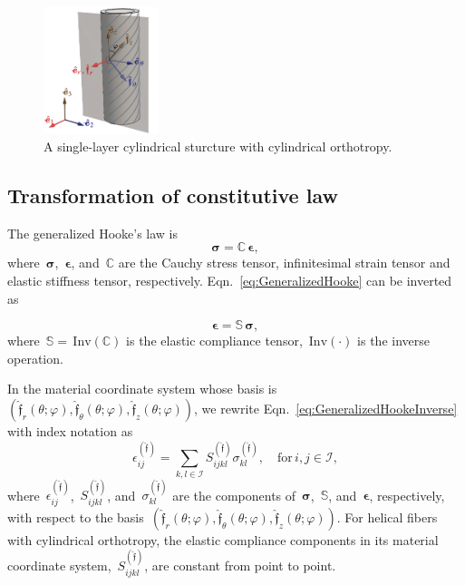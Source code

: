 \documentclass[preprint,12pt,times,draft]{elsarticle}
\numberwithin{equation}{section}
\newcommand{\physf}{\hat{\boldsymbol{\mathfrak{f}}}}
\renewcommand{\u}[1]{\boldsymbol{#1}}
\newcommand{\pr}[1]{\left( #1 \right)}
\newcommand{\Inv}{\,\mathrm{Inv}}
\renewcommand{\>}{$\Rightarrow$}
\begin{document}
\begin{figure}[t]
	\centering
	\graphicspath{{../LyxFiles/figure/}}
	\includegraphics[width=0.3\textwidth]{schematic_V5.pdf}
	\caption{A single-layer cylindrical sturcture with cylindrical orthotropy.
  }
	\label{fig:schematic}
\end{figure}

\subsection{Transformation of constitutive law}
\label{sec:MatrixTrans}
The generalized Hooke's law is
\begin{equation}
\u{\sigma} = \mathbb{C}\, \u{\epsilon},
\label{eq:GeneralizedHooke}
\end{equation}
where~$\u{\sigma}$,~$\u{\epsilon}$, and~$\mathbb{C}$ are the Cauchy stress tensor, infinitesimal strain tensor and elastic stiffness tensor, respectively. Eqn.~\eqref{eq:GeneralizedHooke} can be inverted as

\begin{equation}
 \u{\epsilon} = \mathbb{S}\, \u{\sigma},
\label{eq:GeneralizedHookeInverse}
\end{equation}
where~$\mathbb{S} = \Inv\pr{\mathbb{C}}$ is the elastic compliance tensor, $\Inv\pr{\cdot}$ is the inverse operation.

In the material coordinate system whose basis is~$\pr{\physf_{r}(\theta;\varphi),\physf_{\theta}(\theta;\varphi),\physf_{z}(\theta;\varphi)}$, we rewrite Eqn.~\eqref{eq:GeneralizedHookeInverse} with index notation as
\begin{equation}
\epsilon_{ij}^{\pr{\physf}} = \sum_{k,l \in \mathcal{I}}  S_{ijkl}^{\pr{\physf}} \sigma_{kl}^{\pr{\physf}}, \quad \text{for} \,i,j \in \mathcal{I} ,
\label{eq:GeneralizedHookeComponents}
\end{equation}
where~$\epsilon_{ij}^{\pr{\physf}}$,~$S_{ijkl}^{\pr{\physf}}$, and~$\sigma_{kl}^{\pr{\physf}}$ are the components of~$\u{\sigma}$,~$\mathbb{S}$, and~$\u{\epsilon}$, respectively, with respect to the basis~$\pr{\physf_{r}(\theta;\varphi),\physf_{\theta}(\theta;\varphi),\physf_{z}(\theta;\varphi)}$. For helical fibers with cylindrical orthotropy, the elastic compliance components in its material coordinate system,~$S_{ijkl}^{\pr{\physf}}$, are constant from point to point.
\end{document}
